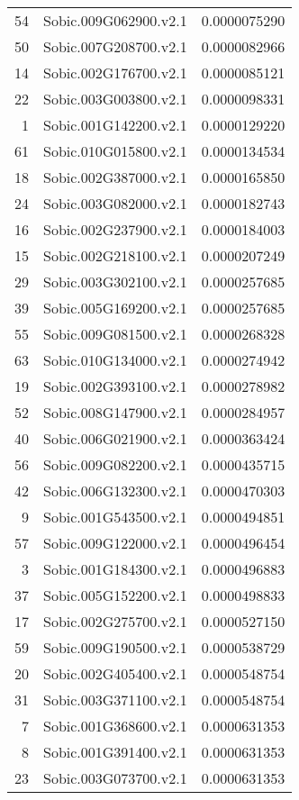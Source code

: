 \documentclass[12pt, a4paper]{article}
\begin{document}
\begin{table}[ht]
\begin{tabular}{rlr}
  54 & Sobic.009G062900.v2.1 & 0.0000075290 \\ 
  50 & Sobic.007G208700.v2.1 & 0.0000082966 \\ 
  14 & Sobic.002G176700.v2.1 & 0.0000085121 \\ 
  22 & Sobic.003G003800.v2.1 & 0.0000098331 \\ 
  1 & Sobic.001G142200.v2.1 & 0.0000129220 \\ 
  61 & Sobic.010G015800.v2.1 & 0.0000134534 \\ 
  18 & Sobic.002G387000.v2.1 & 0.0000165850 \\ 
  24 & Sobic.003G082000.v2.1 & 0.0000182743 \\ 
  16 & Sobic.002G237900.v2.1 & 0.0000184003 \\ 
  15 & Sobic.002G218100.v2.1 & 0.0000207249 \\ 
  29 & Sobic.003G302100.v2.1 & 0.0000257685 \\ 
  39 & Sobic.005G169200.v2.1 & 0.0000257685 \\ 
  55 & Sobic.009G081500.v2.1 & 0.0000268328 \\ 
  63 & Sobic.010G134000.v2.1 & 0.0000274942 \\ 
  19 & Sobic.002G393100.v2.1 & 0.0000278982 \\ 
  52 & Sobic.008G147900.v2.1 & 0.0000284957 \\ 
  40 & Sobic.006G021900.v2.1 & 0.0000363424 \\ 
  56 & Sobic.009G082200.v2.1 & 0.0000435715 \\ 
  42 & Sobic.006G132300.v2.1 & 0.0000470303 \\ 
  9 & Sobic.001G543500.v2.1 & 0.0000494851 \\ 
  57 & Sobic.009G122000.v2.1 & 0.0000496454 \\ 
  3 & Sobic.001G184300.v2.1 & 0.0000496883 \\ 
  37 & Sobic.005G152200.v2.1 & 0.0000498833 \\ 
  17 & Sobic.002G275700.v2.1 & 0.0000527150 \\ 
  59 & Sobic.009G190500.v2.1 & 0.0000538729 \\ 
  20 & Sobic.002G405400.v2.1 & 0.0000548754 \\ 
  31 & Sobic.003G371100.v2.1 & 0.0000548754 \\ 
  7 & Sobic.001G368600.v2.1 & 0.0000631353 \\ 
  8 & Sobic.001G391400.v2.1 & 0.0000631353 \\ 
  23 & Sobic.003G073700.v2.1 & 0.0000631353 \\ 

\end{tabular}
\end{table}
\end{document}
